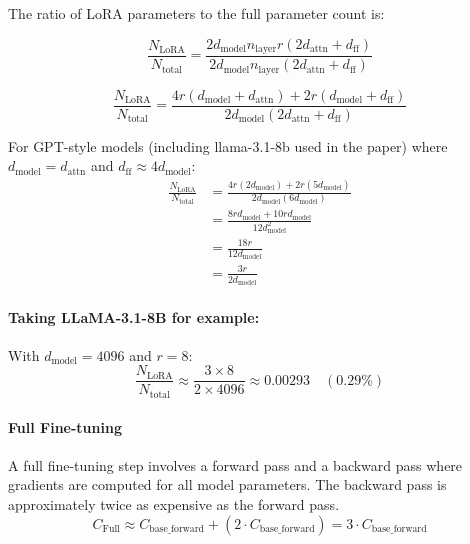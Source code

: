 \documentclass{article} %
\begin{document}
The ratio of LoRA parameters to the full parameter count is:

\begin{equation}
\frac{N_{\text{LoRA}}}{N_{\text{total}}} 
= \frac{2d_{\text{model}}n_{\text{layer}}r(2d_{\text{attn}} + d_{\text{ff}})}
{ 2d_{\text{model}} n_{\text{layer}} \left( 2d_{\text{attn}} + d_{\text{ff}} \right) } 
\end{equation}

\begin{equation}
\frac{N_{\text{LoRA}}}{N_{\text{total}}} 
= \frac{4r(d_{\text{model}} + d_{\text{attn}}) + 2r(d_{\text{model}} + d_{\text{ff}})}
{ 2d_{\text{model}} \left( 2d_{\text{attn}} + d_{\text{ff}} \right) }
\end{equation}

For GPT-style models (including llama-3.1-8b used in the paper) where $d_{\text{model}} = d_{\text{attn}}$ and $d_{\text{ff}} \approx 4d_{\text{model}}$:
\begin{equation}
\begin{aligned}
\frac{N_{\text{LoRA}}}{N_{\text{total}}} 
&= \frac{4r(2d_{\text{model}}) + 2r(5d_{\text{model}})}{ 2d_{\text{model}} (6d_{\text{model}}) } \\
&= \frac{8rd_{\text{model}} + 10rd_{\text{model}}}{12d_{\text{model}}^2} \\
&= \frac{18r}{12d_{\text{model}}} \\
&= \frac{3r}{2d_{\text{model}}}
\end{aligned}
\end{equation}

\paragraph{Taking LLaMA-3.1-8B for example:} With $d_{\text{model}}=4096$ and $r=8$:
\begin{equation}
\frac{N_{\text{LoRA}}}{N_{\text{total}}} \approx \frac{3 \times 8}{2 \times 4096} \approx 0.00293 \quad (\mathbf{0.29\%})
\end{equation}

\paragraph{Full Fine-tuning}
A full fine-tuning step involves a forward pass and a backward pass where gradients are computed for all model parameters. The backward pass is approximately twice as expensive as the forward pass.
\begin{equation}
    C_{\text{Full}} \approx C_{\text{base\_forward}} + (2 \cdot C_{\text{base\_forward}}) = 3 \cdot C_{\text{base\_forward}}
\end{equation}
\end{document}
